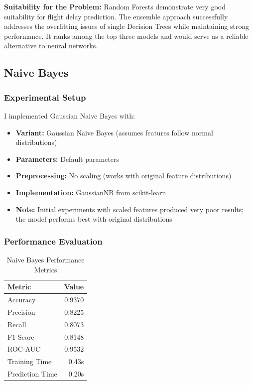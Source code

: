 \documentclass[sigconf]{acmart}
\begin{document}
\textbf{Suitability for the Problem:} Random Forests demonstrate very good suitability for flight delay prediction. The ensemble approach successfully addresses the overfitting issues of single Decision Trees while maintaining strong performance. It ranks among the top three models and would serve as a reliable alternative to neural networks.

\subsection{Naive Bayes}

\subsubsection{Experimental Setup}
I implemented Gaussian Naive Bayes with:
\begin{itemize}
    \item \textbf{Variant:} Gaussian Naive Bayes (assumes features follow normal distributions)
    \item \textbf{Parameters:} Default parameters
    \item \textbf{Preprocessing:} No scaling (works with original feature distributions)
    \item \textbf{Implementation:} GaussianNB from scikit-learn
    \item \textbf{Note:} Initial experiments with scaled features produced very poor results; the model performs best with original distributions
\end{itemize}

\subsubsection{Performance Evaluation}
\begin{table}[h]
\centering
\caption{Naive Bayes Performance Metrics}
\begin{tabular}{lr}
\toprule
Metric & Value \\
\midrule
Accuracy & 0.9370 \\
Precision & 0.8225 \\
Recall & 0.8073 \\
F1-Score & 0.8148 \\
ROC-AUC & 0.9532 \\
Training Time & 0.43s \\
Prediction Time & 0.20s \\
\bottomrule
\end{tabular}
\end{table}
\end{document}
